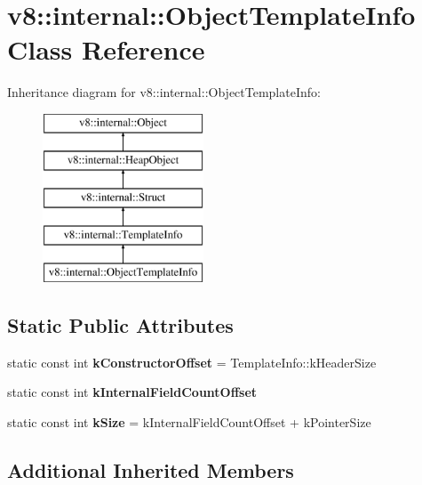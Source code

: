\hypertarget{classv8_1_1internal_1_1_object_template_info}{}\section{v8\+:\+:internal\+:\+:Object\+Template\+Info Class Reference}
\label{classv8_1_1internal_1_1_object_template_info}
Inheritance diagram for v8\+:\+:internal\+:\+:Object\+Template\+Info\+:\begin{figure}[H]
\begin{center}
\leavevmode
\includegraphics[height=5.000000cm]{classv8_1_1internal_1_1_object_template_info}
\end{center}
\end{figure}
\subsection*{Static Public Attributes}
\begin{DoxyCompactItemize}
\item 
static const int {\bfseries k\+Constructor\+Offset} = Template\+Info\+::k\+Header\+Size\hypertarget{classv8_1_1internal_1_1_object_template_info_ac85e930d4eb0afdbceb4a18a9a8c2f7a}{}\label{classv8_1_1internal_1_1_object_template_info_ac85e930d4eb0afdbceb4a18a9a8c2f7a}

\item 
static const int {\bfseries k\+Internal\+Field\+Count\+Offset}
\item 
static const int {\bfseries k\+Size} = k\+Internal\+Field\+Count\+Offset + k\+Pointer\+Size\hypertarget{classv8_1_1internal_1_1_object_template_info_ac2127e12b389db233019614294845f3d}{}\label{classv8_1_1internal_1_1_object_template_info_ac2127e12b389db233019614294845f3d}

\end{DoxyCompactItemize}
\subsection*{Additional Inherited Members}


